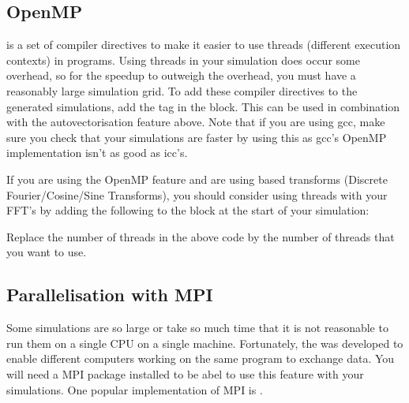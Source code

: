 \documentclass[letterpaper,10pt,english]{sphinxmanual}
\begin{document}
\subsection{OpenMP}
\label{\detokenize{optimisation_hints:openmp}}
\sphinxAtStartPar
{} is a set of compiler directives to make it easier to use threads (different execution contexts) in programs. Using threads in your simulation does occur some overhead, so for the speedup to outweigh the overhead, you must have a reasonably large simulation grid. To add these compiler directives to the generated simulations, add the tag  in the  block. This can be used in combination with the auto\sphinxhyphen{}vectorisation feature above. Note that if you are using gcc, make sure you check that your simulations are faster by using this as gcc’s OpenMP implementation isn’t as good as icc’s.

\sphinxAtStartPar
If you are using the OpenMP feature and are using \sphinxhyphen{}based transforms (Discrete Fourier/Cosine/Sine Transforms), you should consider using threads with your FFT’s by adding the following to the  block at the start of your simulation:

\begin{sphinxVerbatim}[commandchars=\\\{\}]
  
\end{sphinxVerbatim}

\sphinxAtStartPar
Replace the number of threads in the above code by the number of threads that you want to use.


\subsection{Parallelisation with MPI}
\label{\detokenize{optimisation_hints:parallelisation-with-mpi}}
\sphinxAtStartPar
Some simulations are so large or take so much time that it is not reasonable to run them on a single CPU on a single machine. Fortunately, the  was developed to enable different computers working on the same program to exchange data. You will need a MPI package installed to be abel to use this feature with your simulations. One popular implementation of MPI is .
\end{document}
